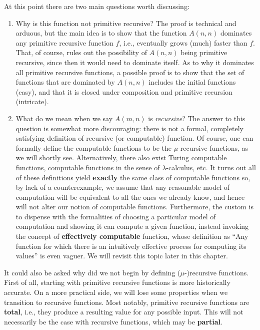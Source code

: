 \documentclass[../main.tex]{memoir}
\begin{document}
At this point there are two main questions worth discussing:

\begin{enumerate}
\item Why is this function not primitive recursive? The proof is technical and arduous, but the main idea is to show that the function $A(n, n)$ dominates any primitive recursive function $f$, i.e., eventually grows (much) faster than $f$. That, of course, rules out the possibility of $A(n, n)$ being primitive recursive, since then it would need to dominate itself. As to why it dominates all primitive recursive functions, a possible proof is to show that the set of functions that are dominated by $A(n, n)$ includes the initial functions (easy), and that it is closed under composition and primitive recursion (intricate).
\item What do we mean when we say $A(m, n)$ is \textit{recursive}? The answer to this question is somewhat more discouraging: there is not a formal, completely satisfying definition of recursive (or computable) function. Of course, one can formally define the computable functions to be the $\mu$-recursive functions, as we will shortly see. Alternatively, there also exist Turing computable functions, computable functions in the sense of $\lambda$-calculus, etc. It turns out all of these definitions yield \textbf{exactly} the same class of computable functions so, by lack of a counterexample, we assume that any reasonable model of computation will be equivalent to all the ones we already know, and hence will not alter our notion of computable functions. Furthermore, the custom is to dispense with the formalities of choosing a particular model of computation and showing it can compute a given function, instead invoking the concept of \textbf{effectively computable} function, whose definition as ``Any function for which there is an intuitively effective process for computing its values'' is even vaguer. We will revisit this topic later in this chapter.
\end{enumerate}

It could also be asked why did we not begin by defining ($\mu$-)recursive functions. First of all, starting with primitive recursive functions is more historically accurate. On a more practical side, we will lose some properties when we transition to recursive functions. Most notably, primitive recursive functions are \textbf{total}, i.e., they produce a resulting value for any possible input. This will not necessarily be the case with recursive functions, which may be \textbf{partial}.
\end{document}
